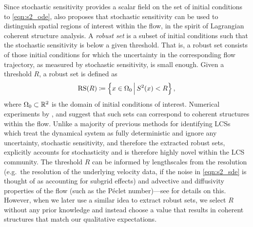 Since stochastic sensitivity provides a scalar field on the set of initial conditions to \cref{eqn:s2_ode}, \citet{Balasuriya_2020_StochasticSensitivityComputable} also proposes that stochastic sensitivity can be used to distinguish spatial regions of interest within the flow, in the spirit of Lagrangian coherent structure analysis.
A \emph{robust set} is a subset of initial conditions such that the stochastic sensitivity is below a given threshold.
That is, a robust set consists of those initial conditions for which the uncertainty in the corresponding flow trajectory, as measured by stochastic sensitivity, is small enough.
Given a threshold \(R\), a robust set is defined as
\[
	\mathrm{RS}\!\left(R\right) \coloneqq \left\{x \in \Omega_0\,\middle|\,S^2\!\left(x\right) < R\right\},
\]
where \(\Omega_0 \subset \mathbb{R}^2\) is the domain of initial conditions of interest.
Numerical experiments by \citet{Balasuriya_2020_StochasticSensitivityComputable}, and \citet{BadzaEtAl_2023_HowSensitiveAre} suggest that such sets can correspond to coherent structures within the flow.
Unlike a majority of previous methods for identifying LCSs which treat the dynamical system as fully deterministic and ignore any uncertainty, stochastic sensitivity, and therefore the extracted robust sets, explicitly accounts for stochasticity and is therefore highly novel within the LCS community.
The threshold \(R\) can be informed by lengthscales from the resolution (e.g.\ the resolution of the underlying velocity data, if the noise in \cref{eqn:s2_sde} is thought of as accounting for subgrid effects) and advective and diffusivity properties of the flow (such as the P\'eclet number)---see \citet{Balasuriya_2020_StochasticSensitivityComputable} for details on this.
However, when we later use a similar idea to extract robust sets, we select \(R\) without any prior knowledge and instead choose a value that results in coherent structures that match our qualitative expectations.


